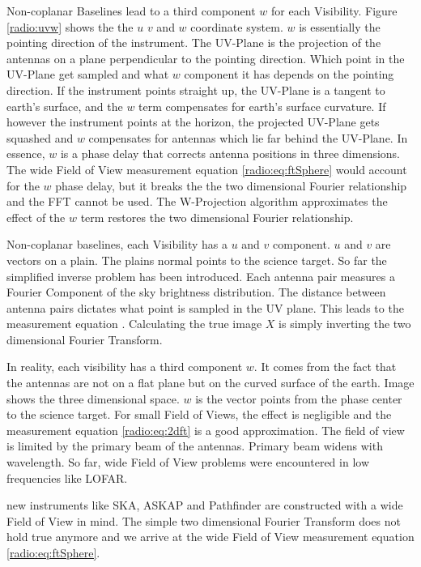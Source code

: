 Non-coplanar Baselines lead to a third component $w$ for each Visibility. Figure \ref{radio:uvw} shows the the $u$ $v$ and $w$ coordinate system. $w$ is essentially the pointing direction of the instrument. The UV-Plane is the projection of the antennas on a plane perpendicular to the pointing direction. Which point in the UV-Plane get sampled and what $w$ component it has depends on the pointing direction. If the instrument points straight up, the UV-Plane is a tangent to earth's surface, and the $w$ term compensates for earth's surface curvature. If however the instrument points at the horizon, the projected UV-Plane gets squashed and $w$ compensates for antennas which lie far behind the UV-Plane. In essence, $w$ is a phase delay that corrects antenna positions in three dimensions. The wide Field of View measurement equation \eqref{radio:eq:ftSphere} would account for the $w$ phase delay, but it breaks the the two dimensional Fourier relationship and the FFT cannot be used. The W-Projection \cite{cornwell2008noncoplanar} algorithm approximates the effect of the $w$ term restores the two dimensional Fourier relationship.



Non-coplanar baselines, each Visibility has a $u$ and $v$ component. $u$ and $v$ are vectors on a plain. The plains normal points to the science target. 
So far the simplified inverse problem has been introduced. Each antenna pair measures a Fourier Component of the sky brightness distribution. The distance between antenna pairs dictates what point is sampled in the UV plane. This leads to the measurement equation . Calculating the true image $X$ is simply inverting the two dimensional Fourier Transform.

In reality, each visibility has a third component $w$. It comes from the fact that the antennas are not on a flat plane but on the curved surface of the earth. Image  shows the three dimensional space. $w$ is the vector points from the phase center to the science target. For small Field of Views, the effect is negligible and the measurement equation \eqref{radio:eq:2dft} is a good approximation. The field of view is limited by the primary beam of the antennas. Primary beam widens with wavelength. So far, wide Field of View problems were encountered in low frequencies like LOFAR.


new instruments like SKA, ASKAP and Pathfinder are constructed with a wide Field of View in mind. The simple two dimensional Fourier Transform does not hold true anymore and we arrive at the wide Field of View measurement equation \eqref{radio:eq:ftSphere}.


